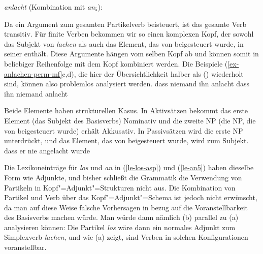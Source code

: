 \eas
\emph{anlacht} (Kombination mit \emph{an$_5$}):\\
\zs

\noindent
Da \anf ein Argument zum gesamten Partikelverb beisteuert, ist das gesamte Verb transitiv.
Für finite Verben bekommen wir so einen komplexen Kopf, der sowohl das Subjekt von \emph{lachen}
als auch das Element, das von \anf beigesteuert wurde, in seiner \compsl enthält.
Diese Argumente hängen vom selben Kopf ab und können somit in beliebiger Reihenfolge
mit dem Kopf kombiniert werden. Die Beispiele (\ref{ex-anlachen-perm-mf}c,d), die hier
der Übersichtlichkeit halber als () wiederholt sind, können also problemlos analysiert werden.
\eal
\ex
dass    niemand           ihn           anlacht
\ex
dass    ihn           niemand          anlacht
\zl

\noindent
Beide Elemente haben strukturellen Kasus. In Aktivsätzen bekommt das erste Element (das Subjekt des Basisverbs)
Nominativ und die zweite NP (die NP, die von \anf beigesteuert wurde) erhält Akkusativ.
In Passivsätzen wird die erste NP unterdrückt, und das Element, das von \anf beigesteuert wurde,
wird zum Subjekt.
\ea
dass    er       nie   angelacht          wurde
\z

\noindent
Die Lexikoneinträge für \emph{los} und \emph{an} in (\ref{le-los-asp}) und (\ref{le-an5})
haben dieselbe Form wie Adjunkte, und bisher schließt die Grammatik die Verwendung von Partikeln
in Kopf"=Adjunkt"=Strukturen nicht aus. Die Kombination von Partikel und Verb über das
Kopf"=Adjunkt"=Schema ist jedoch nicht erwünscht, da man auf diese Weise falsche Vorhersagen in bezug
auf die Voranstellbarkeit des Basisverbs machen würde. Man würde dann nämlich (b) parallel
zu (a) analysieren können:
\eal
{}
\zl
Die Partikel \emph{los} wäre dann ein normales Adjunkt zum Simplexverb \emph{lachen},
und wie (a) zeigt, sind Verben in solchen Konfigurationen voranstellbar.


